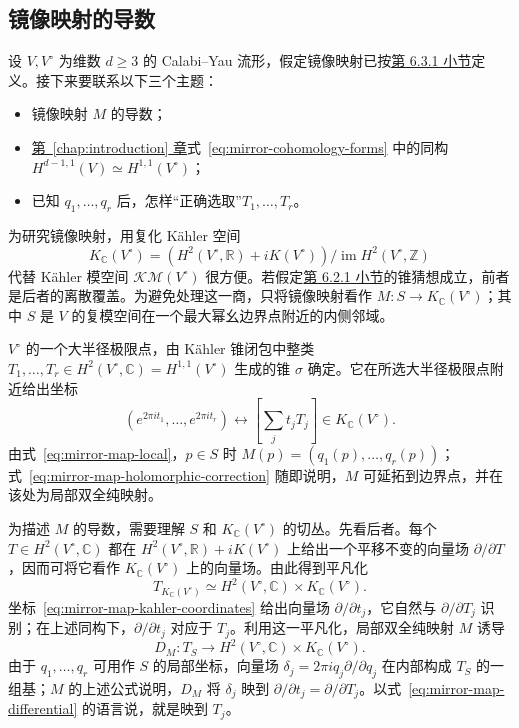 \subsection{镜像映射的导数}\label{subsec:mirror-map-derivative}
设 $V,V^\circ$ 为维数 $d\geq3$ 的 Calabi--Yau 流形，假定镜像映射已按\hyperref[subsec:mirror-map-definition]{第 6.3.1 小节}定义。接下来要联系以下三个主题：
\begin{itemize}
\item 镜像映射 $M$ 的导数；
\item \hyperref[chap:introduction]{第~\ref*{chap:introduction} 章}式~\eqref{eq:mirror-cohomology-forms} 中的同构 $H^{d-1,1}(V)\simeq H^{1,1}(V^\circ)$；
\item 已知 $q_1,\ldots,q_r$ 后，怎样“正确选取”$T_1,\ldots,T_r$。
\end{itemize}
为研究镜像映射，用复化 Kähler 空间
\[
K_{\mathbb C}(V^\circ)
=(H^2(V^\circ,\mathbb R)+iK(V^\circ))/\operatorname{im}H^2(V^\circ,\mathbb Z)
\]
代替 Kähler 模空间 $\mathcal{KM}(V^\circ)$ 很方便。若假定\hyperref[subsec:large-radius-limits]{第 6.2.1 小节}的锥猜想成立，前者是后者的离散覆盖。为避免处理这一商，只将镜像映射看作 $M:S\to K_{\mathbb C}(V^\circ)$；其中 $S$ 是 $V$ 的复模空间在一个最大幂幺边界点附近的内侧邻域。

$V^\circ$ 的一个大半径极限点，由 Kähler 锥闭包中整类 $T_1,\ldots,T_r\in H^2(V^\circ,\mathbb C)=H^{1,1}(V^\circ)$ 生成的锥 $\sigma$ 确定。它在所选大半径极限点附近给出坐标
\begin{equation}\label{eq:mirror-map-kahler-coordinates}
(e^{2\pi it_1},\ldots,e^{2\pi it_r})
\longleftrightarrow\left[\sum_jt_jT_j\right]\in K_{\mathbb C}(V^\circ).
\end{equation}
由式~\eqref{eq:mirror-map-local}，$p\in S$ 时 $M(p)=(q_1(p),\ldots,q_r(p))$；式~\eqref{eq:mirror-map-holomorphic-correction} 随即说明，$M$ 可延拓到边界点，并在该处为局部双全纯映射。

为描述 $M$ 的导数，需要理解 $S$ 和 $K_{\mathbb C}(V^\circ)$ 的切丛。先看后者。每个 $T\in H^2(V^\circ,\mathbb C)$ 都在 $H^2(V^\circ,\mathbb R)+iK(V^\circ)$ 上给出一个平移不变的向量场 $\partial/\partial T$，因而可将它看作 $K_{\mathbb C}(V^\circ)$ 上的向量场。由此得到平凡化
\[
T_{K_{\mathbb C}(V^\circ)}\simeq H^2(V^\circ,\mathbb C)\times K_{\mathbb C}(V^\circ).
\]
坐标~\eqref{eq:mirror-map-kahler-coordinates} 给出向量场 $\partial/\partial t_j$，它自然与 $\partial/\partial T_j$ 识别；在上述同构下，$\partial/\partial t_j$ 对应于 $T_j$。利用这一平凡化，局部双全纯映射 $M$ 诱导
\begin{equation}\label{eq:mirror-map-differential}
D_M:T_S\longrightarrow H^2(V^\circ,\mathbb C)\times K_{\mathbb C}(V^\circ).
\end{equation}
由于 $q_1,\ldots,q_r$ 可用作 $S$ 的局部坐标，向量场 $\delta_j=2\pi iq_j\partial/\partial q_j$ 在内部构成 $T_S$ 的一组基；$M$ 的上述公式说明，$D_M$ 将 $\delta_j$ 映到 $\partial/\partial t_j=\partial/\partial T_j$。以式~\eqref{eq:mirror-map-differential} 的语言说，就是映到 $T_j$。

